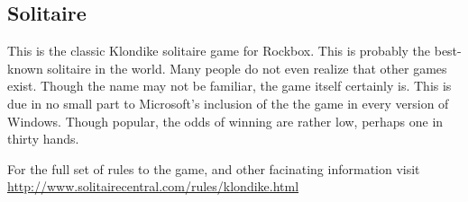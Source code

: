 \subsection{Solitaire}

This is the classic Klondike solitaire game for Rockbox.
This is probably the best-known solitaire in the world. Many people 
do not even realize that other games exist. Though the name may not 
be familiar, the game itself certainly is. This is due in no small 
part to Microsoft's inclusion of the the game in every version of 
Windows. Though popular, the odds of winning are rather low, perhaps 
one in thirty hands.

For the full set of rules to the game, and other facinating information
visit\\
\url{http://www.solitairecentral.com/rules/klondike.html}

